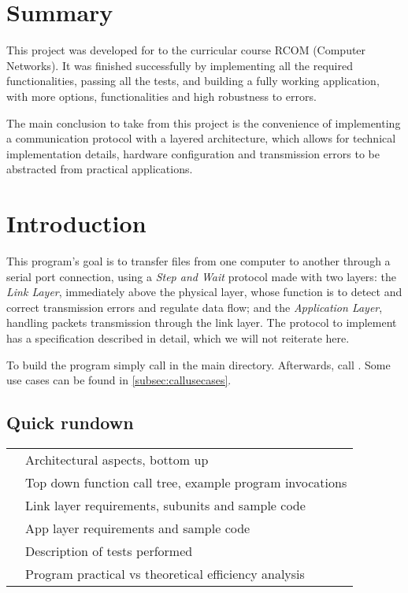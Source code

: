 \documentclass[main.tex]{subfiles}
\begin{document}
\section{Summary}
\label{sec:summary}
   
This project was developed for to the curricular course RCOM (Computer Networks).
It was finished successfully by implementing all the required functionalities, passing all the tests, and building a fully working application, with more options, functionalities and high robustness to errors.

The main conclusion to take from this project is the convenience of implementing a communication protocol with a layered architecture, which allows for technical implementation details, hardware configuration and transmission errors to be abstracted from practical applications.

\section{Introduction}
\label{sec:intro}

This program’s goal is to transfer files from one computer to another through a serial port connection, using a \emph{Step and Wait} protocol made with two layers: the \emph{Link Layer}, immediately above the physical layer, whose function is to detect and correct transmission errors and regulate data flow; and the \emph{Application Layer}, handling packets transmission through the link layer. The protocol to implement has a specification described in detail, which we will not reiterate here.

To build the program simply call  in the main directory. Afterwards, call . Some use cases can be found in \autoref{subsec:callusecases}.

\subsection{Quick rundown}
\label{subsec:rundown}

\begin{tabular}{ll}
	\nameref{sec:arch} & Architectural aspects, bottom up \\
	\nameref{sec:usecases} & Top down function call tree, example program invocations \\
	\nameref{sec:llprotocol} & Link layer requirements, subunits and sample code \\
	\nameref{sec:alprotocol} & App layer requirements and sample code \\
	\nameref{sec:validation} & Description of tests performed \\
	\nameref{sec:pefficiency} & Program practical vs theoretical efficiency analysis
\end{tabular}
\end{document}
